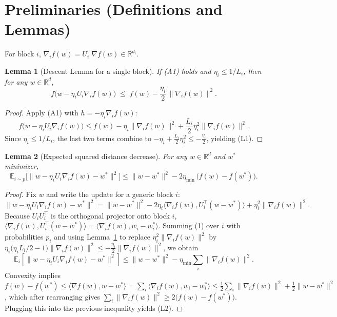 \documentclass{article}
\newtheorem{lemma}{Lemma}
\newcommand{\E}{\mathbb{E}}
\newcommand{\R}{\mathbb{R}}
\begin{document}
\newpage
\section*{Preliminaries (Definitions and Lemmas)}
\begin{definition}
For block $i$, $\nabla_i f(w)=U_i^{\top}\nabla f(w)\in\R^{d_i}$.
\end{definition}
\begin{lemma}[Descent Lemma for a single block]\label{lem:descent}
If (A1) holds and $\eta_i\le1/L_i$, then for any $w\in\R^{d}$,
\[
f\!\big(w - \eta_iU_i\nabla_i f(w)\big)
\;\le\;
f(w)-\frac{\eta_i}{2}\,\|\nabla_i f(w)\|^{2}. \tag{L1}
\]
\end{lemma}
\begin{proof}
Apply (A1) with $h=-\eta_i\nabla_i f(w)$:
\[
f\!\big(w-\eta_iU_i\nabla_i f(w)\big)
\le f(w)-\eta_i\|\nabla_i f(w)\|^{2}
+\frac{L_i}{2}\eta_i^{2}\|\nabla_i f(w)\|^{2}.
\]
Since $\eta_i\le1/L_i$, the last two terms combine to
$-\eta_i+\frac{L_i}{2}\eta_i^{2}\le -\frac{\eta_i}{2}$, yielding (L1).
\end{proof}
\begin{lemma}[Expected squared distance decrease]\label{lem:dist}
For any $w\in\R^{d}$ and $w^{*}$ minimizer,
\[
\E_{i\sim p}\!\big[\|w-\eta_iU_i\nabla_i f(w)-w^{*}\|^{2}\big]
\le \|w-w^{*}\|^{2}
-2\eta_{\min}\,\big(f(w)-f(w^{*})\big). \tag{L2}
\]
\end{lemma}
\begin{proof}
Fix $w$ and write the update for a generic block $i$:
\[
\|w-\eta_iU_i\nabla_i f(w)-w^{*}\|^{2}
= \|w-w^{*}\|^{2}
-2\eta_i\langle\nabla_i f(w),U_i^{\top}(w-w^{*})\rangle
+\eta_i^{2}\|\nabla_i f(w)\|^{2}. \tag{1}
\]
Because $U_iU_i^{\top}$ is the orthogonal projector onto block $i$,
$\langle\nabla_i f(w),U_i^{\top}(w-w^{*})\rangle
= \langle\nabla_i f(w), w_i-w^{*}_i\rangle$.
Summing (1) over $i$ with probabilities $p_i$ and using Lemma~\ref{lem:descent}
to replace $\eta_i^{2}\|\nabla_i f(w)\|^{2}$ by
$\eta_i\big(\eta_i L_i/2-1\big)\|\nabla_i f(w)\|^{2}\le -\frac{\eta_i}{2}\|\nabla_i f(w)\|^{2}$,
we obtain
\[
\E_i[\|w-\eta_iU_i\nabla_i f(w)-w^{*}\|^{2}]
\le \|w-w^{*}\|^{2}
- \eta_{\min}\sum_{i} \|\nabla_i f(w)\|^{2}.
\]
Convexity implies $f(w)-f(w^{*})\le \langle\nabla f(w),w-w^{*}\rangle
= \sum_i\langle\nabla_i f(w),w_i-w^{*}_i\rangle
\le \frac12\sum_i\|\nabla_i f(w)\|^{2}+\frac12\|w-w^{*}\|^{2}$,
which after rearranging gives
$\sum_i\|\nabla_i f(w)\|^{2}\ge 2\big(f(w)-f(w^{*})\big)$. Plugging this into the
previous inequality yields (L2).
\end{proof}
\end{document}
